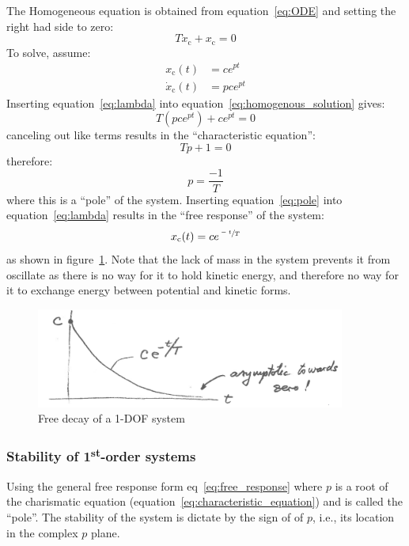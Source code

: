 \documentclass[12pt,letter]{article}
\numberwithin{ex}{section} %
\numberwithin{re}{section} %
\numberwithin{equation}{section}	%
\begin{document}
The Homogeneous equation is obtained from equation~\ref{eq:ODE} and setting the right had side to zero:
\begin{equation}
T\dot{x}_\text{c} + x_\text{c} = 0
\label{eq:homogenous_solution}
\end{equation}
To solve, assume: 
\begin{align}
\label{eq:lambda}
x_\text{c}(t) &= c e^{ p t} \\
\dot{x}_\text{c}(t) &= p c e^{ p t} \nonumber
\end{align}
Inserting equation~\ref{eq:lambda} into equation~\ref{eq:homogenous_solution} gives:
\begin{equation}
T (p c e^{ p t}) + c e^{ p t} = 0
\end{equation}
canceling out like terms results in the ``characteristic equation'':
\begin{equation}
T p  + 1 = 0
\label{eq:characteristic_equation}
\end{equation}
therefore:
\begin{equation}
p  = \frac{-1}{T}
\label{eq:pole}
\end{equation}
where this is a ``pole'' of the system. Inserting equation~\ref{eq:pole} into equation~\ref{eq:lambda} results in the ``free response'' of the system:
\begin{equation}
\label{eq:free_response}
x_\text{c}(t) = c e^{ \sfrac{-t}{T}}
\end{equation}
as shown in figure~\ref{fig:1-DOF_free_decay}. Note that the lack of mass in the system prevents it from oscillate as there is no way for it to hold kinetic energy, and therefore no way for it to exchange energy between potential and kinetic forms. 
\begin{figure}[H]
	\centering
	\includegraphics[width=4in]{../figures/free_decay.png}
	\caption{Free decay of a 1-DOF system}
	\label{fig:1-DOF_free_decay}
\end{figure}

\subsubsection{Stability of 1\textsuperscript{st}-order systems}
Using the general free response form eq~\ref{eq:free_response} where $p$ is a root of the charismatic equation (equation~\ref{eq:characteristic_equation}) and is called the ``pole''. The stability of the system is dictate by the sign of of $p$, i.e., its location in the complex $p$ plane.
\end{document}
